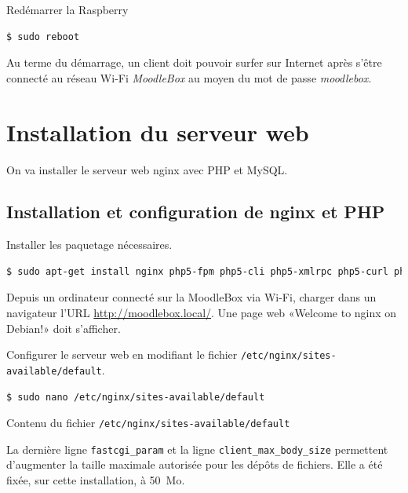 \documentclass[11pt]{article}
\begin{document}
Redémarrer la Raspberry

\begin{lstlisting}[language=bash]
$ sudo reboot
\end{lstlisting}

\begin{verification}
Au terme du démarrage, un client doit pouvoir surfer sur Internet après s'être connecté au réseau Wi-Fi \emph{MoodleBox} au moyen du mot de passe \emph{moodlebox}.
\end{verification}

\section{Installation du serveur web}

On va installer le serveur web nginx avec PHP et MySQL.

\subsection{Installation et configuration de nginx et PHP}

Installer les paquetage nécessaires.

\begin{lstlisting}[language=bash]
$ sudo apt-get install nginx php5-fpm php5-cli php5-xmlrpc php5-curl php5-gd php5-intl
\end{lstlisting}

\begin{verification}
Depuis un ordinateur connecté sur la MoodleBox via Wi-Fi, charger dans un navigateur l'URL \url{http://moodlebox.local/}. Une page web «Welcome to nginx on Debian!» doit s'afficher.
\end{verification}

Configurer le serveur web en modifiant le fichier \lstinline{/etc/nginx/sites-available/default}.

\begin{lstlisting}[language=bash]
$ sudo nano /etc/nginx/sites-available/default
\end{lstlisting}

Contenu du fichier \lstinline{/etc/nginx/sites-available/default}



La dernière ligne \lstinline{fastcgi_param} et la ligne \lstinline{client_max_body_size} permettent d'augmenter la taille maximale autorisée pour les dépôts de fichiers. Elle a été fixée, sur cette installation, à 50~Mo.
\end{document}
